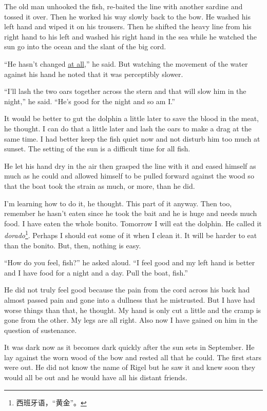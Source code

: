 \documentclass[fontset=ubuntu,zihao=-4]{ctexrep}
\begin{document}
The old man unhooked the fish, re-baited the line with another sardine and
\gls{tossed} it over. Then he worked his way slowly back to the bow. He washed his
left hand and wiped it on his trousers. Then he shifted the heavy line from
his right hand to his left and washed his right hand in the sea while he
watched the sun go into the ocean and the slant of the big cord.

``He hasn't changed \uline{at all},'' he said. But watching the movement of the
water against his hand he noted that it was \gls{perceptibly} slower.

``I'll \gls{lash} the two oars together across the stern and that will slow
him in the night,'' he said. ``He's good for the night and so am I.''

It would be better to gut the dolphin a little later to save the blood in
the meat, he thought. I can do that a little later and lash the oars to make
a drag at the same time. I had better keep the fish quiet now and not
disturb him too much at sunset. The setting of the sun is a difficult time
for all fish.

He let his hand dry in the air then \gls{grasped} the line with it and
\gls{eased} himself as much as he could and allowed himself to be pulled
forward against the wood so that the boat took the strain as much, or more,
than he did.

I'm learning how to do it, he thought. This part of it anyway. Then too,
remember he hasn't eaten since he took the bait and he is huge and needs
much food. I have eaten the whole bonito. Tomorrow I will eat the dolphin.
He called it \emph{dorado}\footnote{西班牙语，“黄金”。}. Perhaps I should eat some
of it when I clean it. It will be harder to eat than the bonito. But, then,
nothing is easy.

``How do you feel, fish?'' he asked aloud. ``I feel good and my left hand is
better and I have food for a night and a day. Pull the boat, fish.''

He did not truly feel good because the pain from the cord across his back
had almost passed pain and gone into a \gls{dullness} that he
\gls{mistrusted}. But I have had worse things than that, he thought. My hand
is only cut a little and the cramp is gone from the other. My legs are all
right. Also now I have gained on him in the question of \gls{sustenance}.

It was dark now as it becomes dark quickly after the sun sets in September.
He lay against the \gls{worn} wood of the bow and rested all that he could. The
first stars were out. He did not know the name of \gls{Rigel} but he saw it and
knew soon they would all be out and he would have all his \gls{distant} friends.
\end{document}

